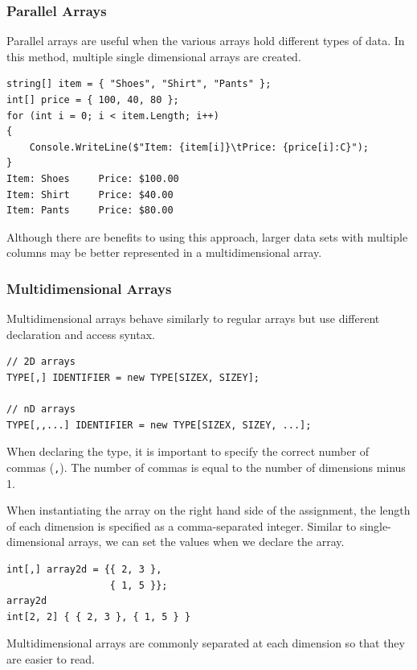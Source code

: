 \documentclass{article}
\def\customlinemarker#1#2{
    \edef\thelstnumber{%
        \unexpanded{%
            \ifnum#1=\value{lstnumber}\relax
              #2%
            \fi}%
        \ifx\thelstnumber\relax\else
        \expandafter\unexpanded\expandafter{\thelstnumber}%
        \fi
    }
}
\begin{document}
\subsubsection{Parallel Arrays}
Parallel arrays are useful when the various arrays
hold different types of data. In this method, multiple
single dimensional arrays are created.
\begingroup
\let\thelstnumber\relax
\customlinemarker{1}{\$}
\customlinemarker{2}{\$}
\customlinemarker{3}{\$}
\customlinemarker{4}{.}
\customlinemarker{5}{.}
\customlinemarker{6}{.}
\begin{lstlisting}
string[] item = { "Shoes", "Shirt", "Pants" };
int[] price = { 100, 40, 80 };
for (int i = 0; i < item.Length; i++) 
{
    Console.WriteLine($"Item: {item[i]}\tPrice: {price[i]:C}");
}
Item: Shoes     Price: $100.00
Item: Shirt     Price: $40.00
Item: Pants     Price: $80.00
\end{lstlisting}
\endgroup
Although there are benefits to using this approach, larger data
sets with multiple columns may be better represented in a
multidimensional array.
\subsubsection{Multidimensional Arrays}
Multidimensional arrays behave similarly to regular arrays
but use different declaration and access syntax.
\begin{lstlisting}[numbers=none]
// 2D arrays
TYPE[,] IDENTIFIER = new TYPE[SIZEX, SIZEY];

// nD arrays
TYPE[,,...] IDENTIFIER = new TYPE[SIZEX, SIZEY, ...];
\end{lstlisting}
When declaring the type, it is important to specify the correct
number of commas (\lstinline{,}). The number of commas is equal to
the number of dimensions minus 1.

When instantiating the array on the right hand side of the assignment,
the length of each dimension is specified as a comma-separated integer.
Similar to single-dimensional arrays, we can set the values when we declare the array.
\begingroup
\let\thelstnumber\relax
\customlinemarker{1}{\$}
\customlinemarker{2}{.}
\customlinemarker{3}{\$}
\begin{lstlisting}
int[,] array2d = {{ 2, 3 },
                  { 1, 5 }};
array2d
int[2, 2] { { 2, 3 }, { 1, 5 } }
\end{lstlisting}
\endgroup
Multidimensional arrays are commonly separated at each dimension
so that they are easier to read.
\end{document}
